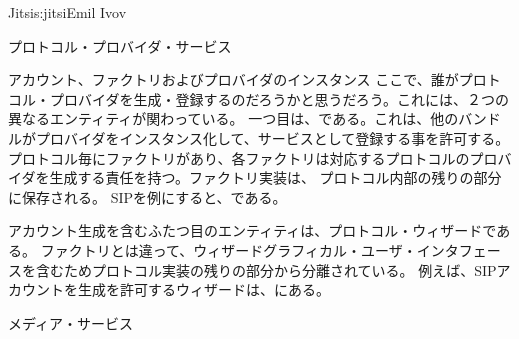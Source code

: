 \begin{aosachapter}{Jitsi}{s:jitsi}{Emil Ivov}
\begin{aosasect1}{プロトコル・プロバイダ・サービス}
\begin{aosasect2}{アカウント、ファクトリおよびプロバイダのインスタンス}
ここで、誰がプロトコル・プロバイダを生成・登録するのだろうかと思うだろう。これには、２つの異なるエンティティが関わっている。
一つ目は、である。これは、他のバンドルがプロバイダをインスタンス化して、サービスとして登録する事を許可する。
プロトコル毎にファクトリがあり、各ファクトリは対応するプロトコルのプロバイダを生成する責任を持つ。ファクトリ実装は、
プロトコル内部の残りの部分に保存される。
SIPを例にすると、である。

アカウント生成を含むふたつ目のエンティティは、プロトコル・ウィザードである。
ファクトリとは違って、ウィザードグラフィカル・ユーザ・インタフェースを含むためプロトコル実装の残りの部分から分離されている。
例えば、SIPアカウントを生成を許可するウィザードは、にある。

\end{aosasect2}

\end{aosasect1}

\begin{aosasect1}{メディア・サービス}


\end{aosasect1}
\end{aosachapter}
